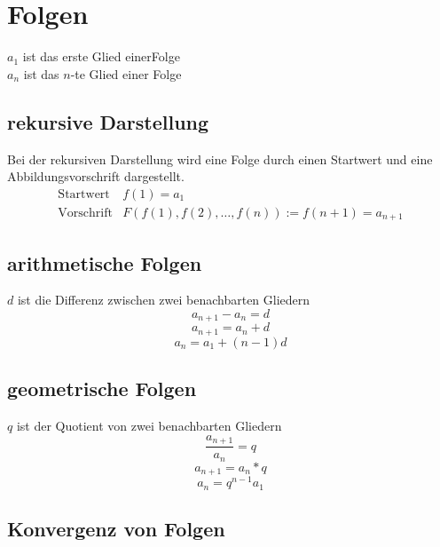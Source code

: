 \section{Folgen}
$a_1$ ist das erste Glied einerFolge\\
$a_n$ ist das $n$-te Glied einer Folge

\subsection{rekursive Darstellung}
Bei der rekursiven Darstellung wird eine Folge durch einen Startwert und eine Abbildungsvorschrift dargestellt. \\
\[ \boxed{ \begin{matrix}
\text{Startwert} & f(1) = a_1 \\
\text{Vorschrift} & F(f(1), f(2), \ldots, f(n)) := f(n + 1) = a_{n + 1}
\end{matrix}} \]

\subsection{arithmetische Folgen}
$d$ ist die Differenz zwischen zwei benachbarten Gliedern\\
\[ \boxed{a_{n+1} - a_n = d} \]
\[ \boxed{a_{n+1} = a_n + d} \]
\[ \boxed{a_n = a_1 + (n - 1)d} \]

\subsection{geometrische Folgen}
$q$ ist der Quotient von zwei benachbarten Gliedern\\
\[ \boxed{\frac{a_{n+1}}{a_n} = q} \]
\[ \boxed{a_{n+1} = a_n * q} \]
\[ \boxed{a_n = q^{n-1} a_1} \]

\subsection{Konvergenz von Folgen}
